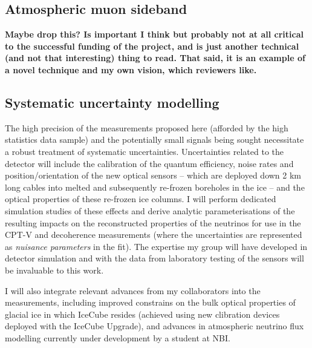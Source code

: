 \documentclass[a4paper,11pt]{article}
\begin{document}
\subsection{Atmospheric muon sideband}

\textbf{Maybe drop this? Is important I think but probably not at all critical to the successful funding of the project, and is just another technical (and not that interesting) thing to read. That said, it is an example of a novel technique and my own vision, which reviewers like.}


\subsection{Systematic uncertainty modelling}


The high precision of the measurements proposed here (afforded by the high statistics data sample) and the potentially small signals being sought necessitate a robust treatment of systematic uncertainties. Uncertainties related to the detector will include the calibration of the quantum efficiency, noise rates and position/orientation of the new optical sensors -- which are deployed down 2 km long cables into melted and subsequently re-frozen boreholes in the ice -- and the optical properties of these re-frozen ice columns. I will perform dedicated simulation studies of these effects and derive analytic parameterisations of the resulting impacts on the reconstructed properties of the neutrinos for use in the CPT-V and decoherence measurements (where the uncertainties are represented as \textit{nuisance parameters} in the fit). The expertise my group will have developed in detector simulation and with the data from laboratory testing of the sensors will be invaluable to this work.

I will also integrate relevant advances from my collaborators into the measurements, including improved constrains on the bulk optical properties of glacial ice in which IceCube resides (achieved using new clibration devices deployed with the IceCube Upgrade), and advances in atmospheric neutrino flux modelling currently under development by a student at NBI.
\end{document}
